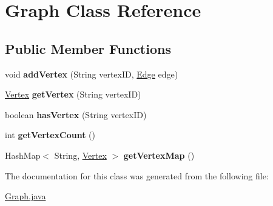 \hypertarget{class_graph}{\section{Graph Class Reference}
\label{class_graph}
}
\subsection*{Public Member Functions}
\begin{DoxyCompactItemize}
\item 
\hypertarget{class_graph_a057fcdd662a72caa686d040b003b3965}{void {\bfseries add\+Vertex} (String vertex\+I\+D, \hyperlink{class_edge}{Edge} edge)}\label{class_graph_a057fcdd662a72caa686d040b003b3965}

\item 
\hypertarget{class_graph_a1c30cb604ce468ee430eb55333844a04}{\hyperlink{class_vertex}{Vertex} {\bfseries get\+Vertex} (String vertex\+I\+D)}\label{class_graph_a1c30cb604ce468ee430eb55333844a04}

\item 
\hypertarget{class_graph_a628649853217f6c4c03679a0ee138dde}{boolean {\bfseries has\+Vertex} (String vertex\+I\+D)}\label{class_graph_a628649853217f6c4c03679a0ee138dde}

\item 
\hypertarget{class_graph_a007a1d7365127b0038175e04be7ee3e0}{int {\bfseries get\+Vertex\+Count} ()}\label{class_graph_a007a1d7365127b0038175e04be7ee3e0}

\item 
\hypertarget{class_graph_a1255a24915fbb017558ea54a197c8769}{Hash\+Map$<$ String, \hyperlink{class_vertex}{Vertex} $>$ {\bfseries get\+Vertex\+Map} ()}\label{class_graph_a1255a24915fbb017558ea54a197c8769}

\end{DoxyCompactItemize}


The documentation for this class was generated from the following file\+:\begin{DoxyCompactItemize}
\item 
\hyperlink{_graph_8java}{Graph.\+java}\end{DoxyCompactItemize}
